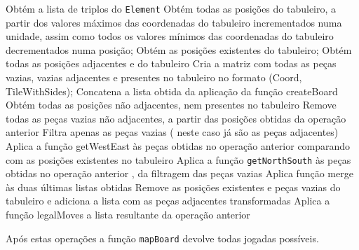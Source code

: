 Obtém a lista de triplos do \texttt{Element}
Obtém todas as posições do tabuleiro, a partir dos valores máximos das coordenadas do tabuleiro incrementados numa unidade,
assim como todos os valores mínimos das coordenadas do tabuleiro decrementados numa posição;
Obtém as posições existentes do tabuleiro;
Obtém todas as posições adjacentes e do tabuleiro
Cria a matriz com todas as peças vazias, vazias adjacentes e presentes no tabuleiro no formato (Coord,
TileWithSides);
Concatena a lista obtida da aplicação da função createBoard
Obtém todas as posições não adjacentes, nem presentes no tabuleiro
Remove todas as peças vazias não adjacentes, a partir das posições obtidas da operação anterior
Filtra apenas as peças vazias ( neste caso já são as peças adjacentes)
Aplica a função getWestEast às peças obtidas no operação anterior comparando com as posições existentes no
tabuleiro
Aplica a função  \texttt{getNorthSouth} às peças obtidas no operação anterior , da filtragem das peças vazias
Aplica função merge às duas últimas listas obtidas 
Remove as posições existentes e peças vazias do tabuleiro e adiciona a lista com as peças adjacentes
transformadas
Aplica a função legalMoves a lista resultante da operação anterior 

Após estas operações a função \texttt{mapBoard} devolve todas jogadas possíveis.

